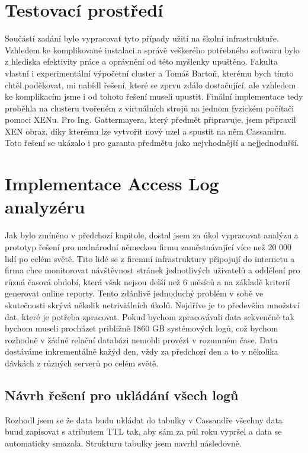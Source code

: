 \section{Testovací prostředí}
Součástí zadání bylo vypracovat tyto případy užití na školní infrastruktuře. Vzhledem ke komplikované instalaci a správě veškerého potřebného softwaru bylo z hlediska efektivity práce a oprávnění od této myšlenky upuštěno. Fakulta vlastní i experimentální výpočetní cluster a Tomáš Bartoň, kterému bych tímto chtěl poděkovat, mi nabídl řešení, které se zprvu zdálo dostačující, ale vzhledem ke komplikacím jsme i od tohoto řešení museli upustit. Finální implementace tedy proběhla na clusteru tvořeném z virtuálních strojů na jednom fyzickém počítači pomoci XENu. Pro Ing. Gattermayera, který předmět připravuje, jsem připravil XEN obraz, díky kterému lze vytvořit nový uzel a spustit na něm Cassandru. Toto řešení se ukázalo i pro garanta předmětu jako nejvhodnější a nejjednodušší. 

\section{Implementace Access Log analyzéru}
Jak bylo zmíněno v předchozí kapitole, dostal jsem za úkol vypracovat analýzu a prototyp řešení pro nadnárodní německou firmu zaměstnávající  více než 20 000 lidí po celém světě. Tito lidé se z firemní infrastruktury připojují do internetu a firma chce monitorovat návštěvnost stránek jednotlivých uživatelů a oddělení pro různá časová období, která však nejsou delší než 6 měsíců a na základě kriterií generovat online reporty. Tento zdánlivě jednoduchý problém v sobě ve skutečnosti skrývá několik netriviálních úkolů. Nejdříve je to především množství dat, které je potřeba zpracovat. Pokud bychom zpracovávali data sekvenčně tak bychom museli procházet približně 1860 GB systémových logů, což bychom rozhodně v žádné relační databázi nemohli provézt v rozumném čase. Data dostáváme inkrementálně kažýd den, vždy za předchozí den a to v několika dávkách z různých serverů po celém světě. 


\subsection{Návrh řešení pro ukládání všech logů}
Rozhodl jsem se že data budu ukládat do tabulky v Cassandře všechny data buud zapisovat s atributem TTL tak, aby sám za půl roku vypršel a data se automaticky smazala. Strukturu tabulky jsem navrhl následovně. 


